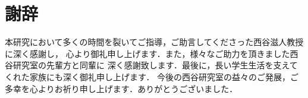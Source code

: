 \section{謝辞}
本研究において多くの時間を裂いてご指導，ご助言してくださった西谷滋人教授に深く感謝し，
心より御礼申し上げます．また，様々なご助力を頂きました西谷研究室の先輩方と同輩に
深く感謝致します．最後に，長い学生生活を支えてくれた家族にも深く御礼申し上げます．
今後の西谷研究室の益々のご発展，ご多幸を心よりお祈り申し上げます．ありがとうございました．